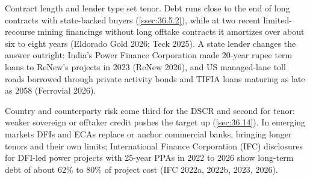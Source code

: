 Contract length and lender type set tenor. Debt runs close to the end of long contracts with state-backed buyers (\cref{ssec:36.5.2}), while at two recent limited-recourse mining financings without long offtake contracts it amortizes over about six to eight years (Eldorado Gold 2026; Teck 2025). A state lender changes the answer outright: India's Power Finance Corporation made 20-year rupee term loans to ReNew's projects in 2023 (ReNew 2026), and US managed-lane toll roads borrowed through private activity bonds and TIFIA loans maturing as late as 2058 (Ferrovial 2026).

Country and counterparty risk come third for the DSCR and second for tenor: weaker sovereign or offtaker credit pushes the target up (\cref{sec:36.14}). In emerging markets DFIs and ECAs replace or anchor commercial banks, bringing longer tenors and their own limits; International Finance Corporation (IFC) disclosures for DFI-led power projects with 25-year PPAs in 2022 to 2026 show long-term debt of about 62\% to 80\% of project cost (IFC 2022a, 2022b, 2023, 2026).

